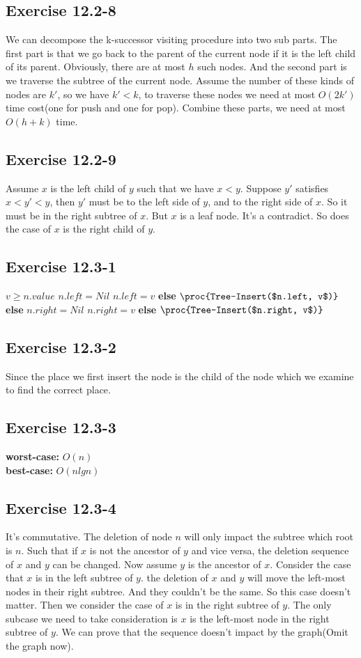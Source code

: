 \documentclass[12pt]{article}
\theoremstyle{definition}
\theoremstyle{remark}
\begin{document}
\subsection*{Exercise 12.2-8}
We can decompose the k-successor visiting procedure into two sub parts. The first part is that we go back to the parent of the current node if it is the left child of its parent. Obviously, there are at most $h$ such nodes. And the second part is we traverse the subtree of the current node. Assume the number of these kinds of nodes are $k'$, so we have $k'<k$, to traverse these nodes we need at most $O(2k')$ time cost(one for push and one for pop). Combine these parts, we need at most $O(h+k)$ time.
\subsection*{Exercise 12.2-9}
Assume $x$ is the left child of $y$ such that we have $x<y$. Suppose $y'$ satisfies $x<y'<y$, then $y'$ must be to the left side of $y$, and to the right side of $x$. So it must be in the right subtree of $x$. But $x$ is a leaf node. It's a contradict. So does the case of $x$ is the right child of $y$.
\subsection*{Exercise 12.3-1}
\begin{codebox}
\li \If $v\ge n.value$ \label{li:if}
\li \quad \If $n.left=Nil$ \label{li:if}
\li \qquad $n.left=v$
\li \quad \textbf{else}
\li \qquad $\proc{Tree-Insert($n.left, v$)}$
\li \textbf{else}
\li \quad \If $n.right=Nil$ \label{li:if}
\li \qquad $n.right=v$
\li \quad \textbf{else}
\li \qquad $\proc{Tree-Insert($n.right, v$)}$
\end{codebox}
\subsection*{Exercise 12.3-2}
Since the place we first insert the node is the child of the node which we examine to find the correct place.
\subsection*{Exercise 12.3-3}
\textbf{worst-case:} $O(n)$\\
\textbf{best-case:} $O(nlgn)$
\subsection*{Exercise 12.3-4}
It's commutative. The deletion of node $n$ will only impact the subtree which root is $n$. Such that if $x$ is not the ancestor of $y$ and vice versa, the deletion sequence of $x$ and $y$ can be changed. Now assume $y$ is the ancestor of $x$. Consider the case that $x$ is in the left subtree of $y$. the deletion of $x$ and $y$ will move the left-most nodes in their right subtree. And they couldn't be the same. So this case doesn't matter. Then we consider the case of $x$ is in the right subtree of $y$. The only subcase we need to take consideration is $x$ is the left-most node in the right subtree of $y$. We can prove that the sequence doesn't impact by the graph(Omit the graph now).
\end{document}
